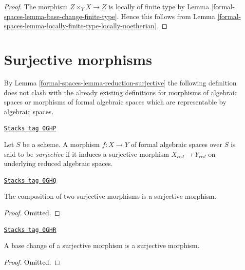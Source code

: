 \begin{proof}
The morphism $Z \times_Y X \to Z$ is locally of finite type by
Lemma \ref{formal-spaces-lemma-base-change-finite-type}. Hence this follows
from Lemma \ref{formal-spaces-lemma-locally-finite-type-locally-noetherian}.
\end{proof}

\section{Surjective morphisms}
\label{formal-spaces-section-surjective}
By Lemma \ref{formal-spaces-lemma-reduction-surjective} the following definition does
not clash with the already existing definitions for morphisms of algebraic
spaces or morphisms of formal algebraic spaces which are representable
by algebraic spaces.

\begin{definition}[Surjective]
\label{formal-spaces-definition-surjective}
\href{https://stacks.math.columbia.edu/tag/0GHP}{\texttt{Stacks tag 0GHP}}

Let $S$ be a scheme. A morphism $f : X \to Y$ of formal algebraic spaces
over $S$ is said to be {\it surjective} if it induces a surjective morphism
$X_{red} \to Y_{red}$ on underlying reduced algebraic spaces.
\end{definition}

\begin{lemma}
\label{formal-spaces-lemma-composition-surjective}
\href{https://stacks.math.columbia.edu/tag/0GHQ}{\texttt{Stacks tag 0GHQ}}

The composition of two surjective morphisms is a surjective morphism.
\end{lemma}

\begin{proof}
Omitted.
\end{proof}

\begin{lemma}
\label{formal-spaces-lemma-base-change-surjective}
\href{https://stacks.math.columbia.edu/tag/0GHR}{\texttt{Stacks tag 0GHR}}

A base change of a surjective morphism is a surjective morphism.
\end{lemma}

\begin{proof}
Omitted.
\end{proof}

